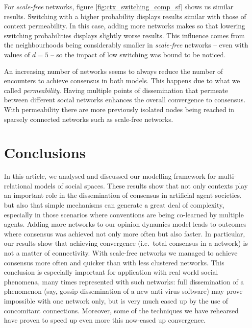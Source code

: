 \documentclass[preprint,number]{elsarticle}
\begin{document}
      For \textit{scale-free} networks, figure \ref{fig:ctx_switching_comp_sf} shows us similar
      results. Switching with a higher probability displays results similar with those of context
      permeability. In this case, adding more networks makes so that lowering switching
      probabilities displays slightly worse results. This influence comes from the neighbourhoods
      being considerably smaller in \textit{scale-free} networks -- even with values of $d=5$ -- so
      the impact of low switching was bound to be noticed.

      An increasing number of networks seems to always reduce the number of encounters to achieve
      consensus in both models. This happens due to what we called \textit{permeability}. Having
      multiple points of dissemination that permeate between different social networks enhances the
      overall convergence to consensus. With permeability there are more previously isolated nodes
      being reached in sparsely connected networks such as scale-free networks.

      \section{Conclusions}
      \label{sec:conclusion-future}
\noindent In this article, we analysed and discussed our modelling framework for multi-relational models of social spaces. These results show that not only contexts play an important role in the dissemination of consensus in artificial agent societies, but also that simple mechanisms can generate a great deal of complexity, especially in those scenarios where conventions are being co-learned by multiple agents. Adding more networks to our opinion dynamics model leads to outcomes where consensus was achieved not only more often but also faster. In particular, our results show that achieving convergence (i.e.\ total consensus in a network) is not a matter of connectivity. With scale-free networks we managed to achieve consensus more often and quicker than with less clustered networks. This conclusion is especially important for application with real world social phenomena, many times represented with such networks: full dissemination of a phenomenon (say, gossip-dissemination of a new anti-virus software) may prove impossible with one network only, but is very much eased up by the use of concomitant connections. Moreover, some of the techniques we have rehearsed have proven to speed up even more this now-eased up convergence.
\end{document}
